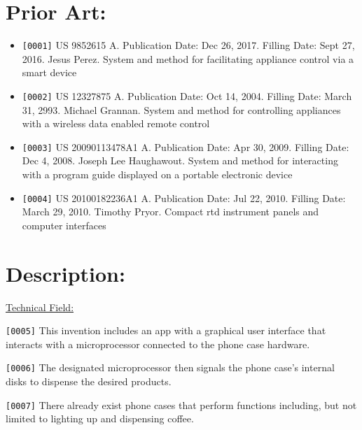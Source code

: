 \documentclass[11pt]{article}
\begin{document}
\section*{Prior Art:}

\begin{itemize}

    \item \verb|[0001]| US 9852615 A. Publication Date: Dec 26, 2017. Filling Date: Sept 27, 2016. Jesus Perez. System and method for facilitating appliance control via a smart device
    
    \item \verb|[0002]| US 12327875 A. Publication Date: Oct 14, 2004. Filling Date: March 31, 2993. Michael Grannan. System and method for controlling appliances with a wireless data enabled remote control 
    
    \item \verb|[0003]| US 20090113478A1 A. Publication Date: Apr 30, 2009. Filling Date: Dec 4, 2008. Joseph Lee Haughawout. System and method for interacting with a program guide displayed on a portable electronic device
    
    \item \verb|[0004]| US 20100182236A1 A. Publication Date: Jul 22, 2010. Filling Date: March 29, 2010. Timothy Pryor. Compact rtd instrument panels and computer interfaces
    
\end{itemize}





\section*{Description:}

\nonindent \underline{Technical Field:} 
\begin{flushleft}
\verb|[0005]| 
\nonindent This invention includes an app with a graphical user interface that interacts with a microprocessor connected to the phone case hardware.

\verb|[0006]|
\nonindent The designated microprocessor then signals the phone case's internal disks to dispense the desired products. 

\verb|[0007]|
\nonindent There already exist phone cases that perform functions including, but not limited to lighting up and dispensing coffee. 

\end{flushleft}
\end{document}
